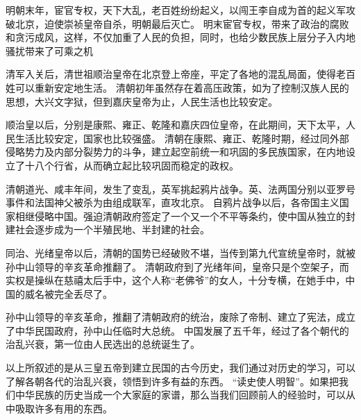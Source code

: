 \documentclass[avery5371,grid]{flashcards}
\begin{document}
{明朝末年，宦官专权，天下大乱，老百姓纷纷起义，以闯王李自成为首的起义军攻破北京，迫使崇祯皇帝自杀，明朝最后灭亡。} %
{明末宦官专权，带来了政治的腐败和贪污成风，这样，不仅加重了人民的负担，同时，也给少数民族上层分子入内地骚扰带来了可乘之机} %

{清军入关后，清世祖顺治皇帝在北京登上帝座，平定了各地的混乱局面，使得老百姓可以重新安定地生活。} %
{清朝初年虽然存在着高压政策，如为了控制汉族人民的思想，大兴文字狱，但到嘉庆皇帝为止，人民生活也比较安定。} %

{顺治皇以后，分别是康熙、雍正、乾隆和嘉庆四位皇帝，在此期间，天下太平，人民生活比较安定，国家也比较强盛。} %
{清朝在康熙、雍正、乾隆时期，经过同外部侵略势力及内部分裂势力的斗争，建立起空前统一和巩固的多民族国家，在内地设立了十八个行省，从而确立起比较巩固而稳定的政权。} %

{清朝道光、咸丰年间，发生了变乱，英军挑起鸦片战争。英、法两国分别以亚罗号事件和法国神父被杀为由组成联军，直攻北京。} %
{自鸦片战争以后，各帝国主义国家相继侵略中国。强迫清朝政府签定了一个又一个不平等条约，使中国从独立的封建社会逐步成为一个半殖民地、半封建的社会。} %

{同治、光绪皇帝以后，清朝的国势已经破败不堪，当传到第九代宣统皇帝时，就被孙中山领导的辛亥革命推翻了。} %
{清朝政府到了光绪年间，皇帝只是个空架子，而实权是操纵在慈禧太后手中，这个人称“老佛爷”的女人，十分专横，在她手中，中国的威名被完全丢尽了。} %

{孙中山领导的辛亥革命，推翻了清朝政府的统治，废除了帝制、建立了宪法，成立了中华民国政府，孙中山任临时大总统。} %
{中国发展了五千年，经过了各个朝代的治乱兴衰，第一位由人民选出的总统诞生了。} %


{以上所叙述的是从三皇五帝到建立民国的古今历史，我们通过对历史的学习，可以了解各朝各代的治乱兴衰，领悟到许多有益的东西。} %
{“读史使人明智”。如果把我们中华民族的历史当成一个大家庭的家谱，那么当我们回顾前人的经验时，可以从中吸取许多有用的东西。} %
\end{document}
